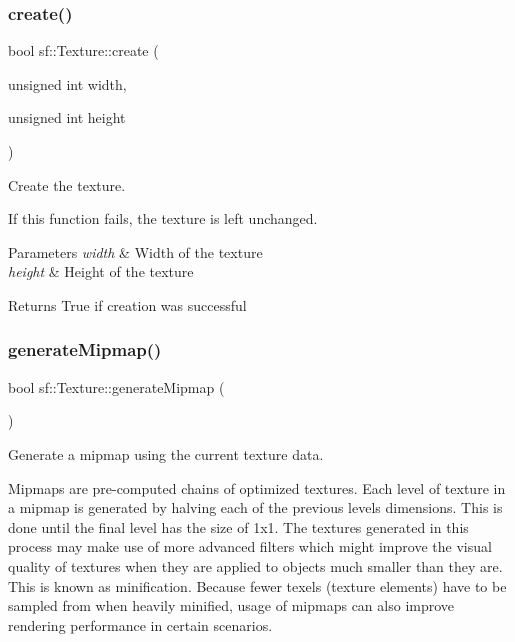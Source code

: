 \subsubsection{\texorpdfstring{create()}{create()}}
{\footnotesize\ttfamily bool sf\+::\+Texture\+::create (\begin{DoxyParamCaption}\item[{unsigned int}]{width,  }\item[{unsigned int}]{height }\end{DoxyParamCaption})}



Create the texture. 

If this function fails, the texture is left unchanged.


\begin{DoxyParams}{Parameters}
{\em width} & Width of the texture \\
\hline
{\em height} & Height of the texture\\
\hline
\end{DoxyParams}
\begin{DoxyReturn}{Returns}
True if creation was successful \begin{DoxyVerb}\end{DoxyVerb}
 
\end{DoxyReturn}
\mbox{\label{classsf_1_1_texture_a7779a75c0324b5faff77602f871710a9}} 
\subsubsection{\texorpdfstring{generateMipmap()}{generateMipmap()}}
{\footnotesize\ttfamily bool sf\+::\+Texture\+::generate\+Mipmap (\begin{DoxyParamCaption}{ }\end{DoxyParamCaption})}



Generate a mipmap using the current texture data. 

Mipmaps are pre-\/computed chains of optimized textures. Each level of texture in a mipmap is generated by halving each of the previous level\textquotesingle{}s dimensions. This is done until the final level has the size of 1x1. The textures generated in this process may make use of more advanced filters which might improve the visual quality of textures when they are applied to objects much smaller than they are. This is known as minification. Because fewer texels (texture elements) have to be sampled from when heavily minified, usage of mipmaps can also improve rendering performance in certain scenarios.

